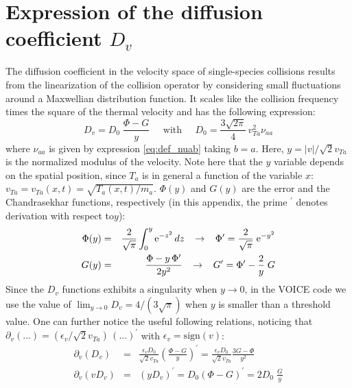 \documentclass[11pt]{article}
\newcommand{\ee}{\textrm e}
\begin{document}
\section{Expression of the diffusion coefficient $D_v$}
\label{appendix:Dv}
The diffusion coefficient in the velocity space of single-species collisions results from the linearization of the collision operator by considering small fluctuations around a Maxwellian distribution function. It scales like the collision frequency times the square of the thermal velocity and has the following expression:
%
\begin{equation} \label{eq:def_Dv}
D_v = D_0 \; \frac{\Phi - G}{y}
\;\;\;\;\; \textrm{with} \;\;\;\;\;
D_0 = \frac{3\sqrt{2\pi}}{4}\, v_{Ta}^2\nu_{aa}
\end{equation}
%
where $\nu_{aa}$ is given by expression \eqref{eq:def_nuab} taking $b=a$. Here, $y = |v|/\sqrt{2}v_{Ta}$ is the normalized modulus of the velocity. Note here that the $y$ variable depends on the spatial position, since $T_a$ is in general a function of the variable $x$: $v_{Ta} = v_{Ta}(x,t) = \sqrt{T_a(x,t)/m_a}$. $\Phi(y)$ and $G(y)$ are the error and the Chandrasekhar functions, respectively (in this appendix, the prime $^\prime$ denotes derivation with respect to$y$):
%
\begin{eqnarray}
\label{eq:def_Phi}
\Phi(y) &=& \frac{2}{\sqrt{\pi}} \int_0^{y} \ee^{-z^2}\,d z 
\;\;\; \to \;\;\;
\Phi^\prime = \frac{2}{\sqrt{\pi}}\; \ee^{-y^2} 
\\
\label{eq:def_G}
G(y)    &=& \frac{\Phi - y\, \Phi^\prime}{2y^2}
\;\;\; \to \;\;\;
G^\prime = \Phi^\prime - \frac{2}{y}\; G 
\end{eqnarray}
%
Since the $D_v$ functions exhibits a singularity when $y \to  0$, in the VOICE code we use the value of $\lim_{y \to 0} D_v   = 4/(3\sqrt{\pi } )$ when $y$ is smaller than a threshold value. One can further notice the useful following relations, noticing that $\partial_v(...) = (\epsilon_v/\sqrt{2}v_{Ta}) \, (...)^\prime$ with $\epsilon_v = \textrm{sign}(v)$:
%
\begin{eqnarray}
\partial_v(D_v) &=& \frac{\epsilon_v D_0}{\sqrt{2}v_{Ta}} 
\left( \frac{\Phi - G}{y}\right)^\prime 
= \frac{\epsilon_v D_0}{\sqrt{2}v_{Ta}} \frac{3G-\Phi}{y^2}
\\
\partial_v(vD_v) &=& (yD_v)^\prime
= D_0 (\Phi-G)^\prime = 2D_0 \; \frac{G}{y}
\end{eqnarray}
%

\newpage
\printbibliography
\end{document}
